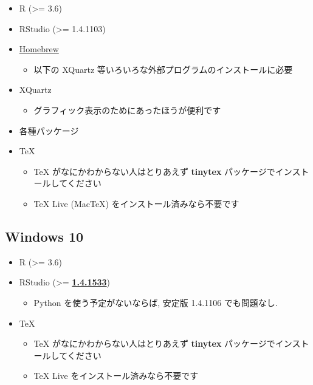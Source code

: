 \documentclass[
]{ltjsarticle}
\providecommand{\tightlist}{%
  \setlength{\itemsep}{0pt}\setlength{\parskip}{0pt}}
\begin{document}
\begin{itemize}
\tightlist
\item
  R (\textgreater= 3.6)
\item
  RStudio (\textgreater= 1.4.1103)
\item
  \href{https://brew.sh/index_ja}{Homebrew}

  \begin{itemize}
  \tightlist
  \item
    以下の XQuartz 等いろいろな外部プログラムのインストールに必要
  \end{itemize}
\item
  XQuartz

  \begin{itemize}
  \tightlist
  \item
    グラフィック表示のためにあったほうが便利です
  \end{itemize}
\item
  各種パッケージ
\item
  TeX

  \begin{itemize}
  \tightlist
  \item
    TeX がなにかわからない人はとりあえず \textbf{tinytex} パッケージでインストールしてください
  \item
    TeX Live (MacTeX) をインストール済みなら不要です
  \end{itemize}
\end{itemize}

\hypertarget{windows-10}{%
\subsection{Windows 10}\label{windows-10}}

\begin{itemize}
\tightlist
\item
  R (\textgreater= 3.6)
\item
  RStudio (\textgreater= \href{https://dailies.rstudio.com/rstudio/oss/windows/}{\textbf{1.4.1533}})

  \begin{itemize}
  \tightlist
  \item
    Python を使う予定がないならば, 安定版 1.4.1106 でも問題なし.
  \end{itemize}
\item
  TeX

  \begin{itemize}
  \tightlist
  \item
    TeX がなにかわからない人はとりあえず \textbf{tinytex} パッケージでインストールしてください
  \item
    TeX Live をインストール済みなら不要です
  \end{itemize}
\end{itemize}
\end{document}

